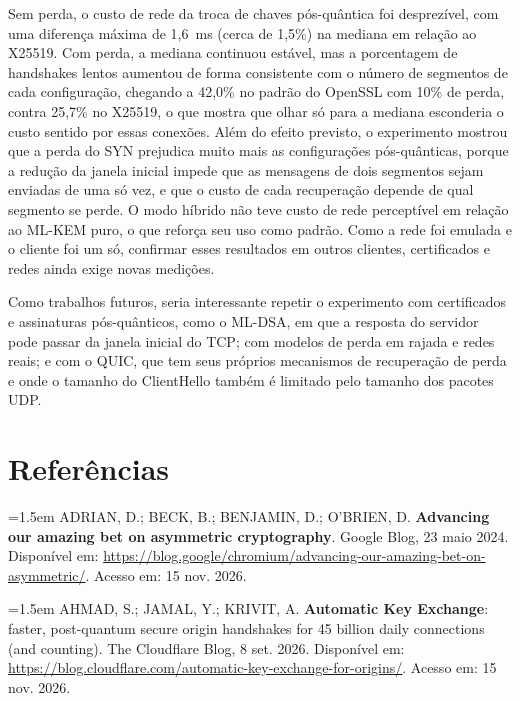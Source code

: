 \documentclass[12pt,a4paper]{article}
\begin{document}
Sem perda, o custo de rede da troca de chaves pós-quântica foi desprezível,
com uma diferença máxima de 1,6~ms (cerca de 1,5\%) na mediana em relação ao
X25519. Com perda, a mediana continuou estável, mas a porcentagem de
handshakes lentos aumentou de forma consistente com o número de segmentos de
cada configuração, chegando a 42,0\% no padrão do OpenSSL com 10\% de perda,
contra 25,7\% no X25519, o que mostra que olhar só para a mediana
esconderia o custo sentido por essas conexões. Além do efeito previsto, o
experimento mostrou que a perda do SYN prejudica muito mais as
configurações pós-quânticas, porque a redução da janela inicial impede que
as mensagens de dois segmentos sejam enviadas de uma só vez, e que o custo
de cada recuperação depende de qual segmento se perde. O modo híbrido não
teve custo de rede perceptível em relação ao ML-KEM puro, o que reforça seu
uso como padrão. Como a rede foi emulada e o cliente foi um só, confirmar
esses resultados em outros clientes, certificados e redes ainda exige novas
medições.

Como trabalhos futuros, seria interessante repetir o experimento com
certificados e assinaturas pós-quânticos, como o ML-DSA, em que a resposta
do servidor pode passar da janela inicial do TCP; com modelos de perda em
rajada e redes reais; e com o QUIC, que tem seus próprios mecanismos de
recuperação de perda e onde o tamanho do ClientHello também é limitado pelo
tamanho dos pacotes UDP.


\section*{Referências}
\begingroup
{}
\setlength{\parindent}{0pt}
\setlength{\parskip}{0.8em}
\newcommand{\refitem}[1]{\hangindent=1.5em #1\par}

\refitem{ADRIAN, D.; BECK, B.; BENJAMIN, D.; O'BRIEN, D. \textbf{Advancing
our amazing bet on asymmetric cryptography}. Google Blog, 23 maio 2024.
Disponível em:
\url{https://blog.google/chromium/advancing-our-amazing-bet-on-asymmetric/}.
Acesso em: 15 nov. 2026.}

\refitem{AHMAD, S.; JAMAL, Y.; KRIVIT, A. \textbf{Automatic Key Exchange}:
faster, post-quantum secure origin handshakes for 45 billion daily
connections (and counting). The Cloudflare Blog, 8 set. 2026. Disponível
em: \url{https://blog.cloudflare.com/automatic-key-exchange-for-origins/}.
Acesso em: 15 nov. 2026.}
\end{document}
